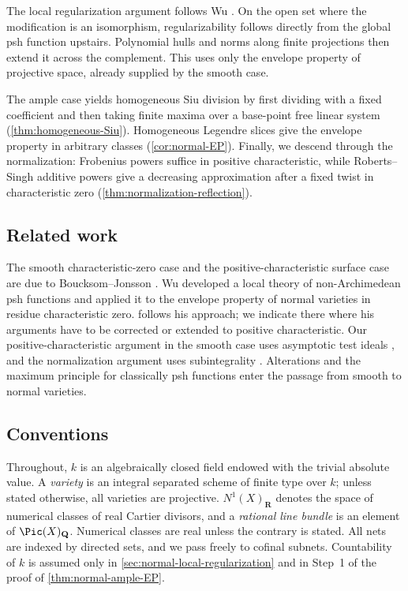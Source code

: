 \documentclass[11pt,a4paper]{article}
\begin{document}
The local regularization argument follows Wu \cite{Wu26}. On the open set where the modification is an isomorphism, regularizability follows directly from the global psh function upstairs. Polynomial hulls and norms along finite projections then extend it across the complement. This uses only the envelope property of projective space, already supplied by the smooth case.

The ample case yields homogeneous Siu division by first dividing with a fixed coefficient and then taking finite maxima over a base-point free linear system (\cref{thm:homogeneous-Siu}). Homogeneous Legendre slices give the envelope property in arbitrary classes (\cref{cor:normal-EP}). Finally, we descend through the normalization: Frobenius powers suffice in positive characteristic, while Roberts--Singh additive powers give a decreasing approximation after a fixed twist in characteristic zero (\cref{thm:normalization-reflection}).

\subsection{Related work}

The smooth characteristic-zero case and the positive-characteristic surface case are due to Boucksom--Jonsson \cite{BJ22,BJaddendum}. Wu \cite{Wu26} developed a local theory of non-Archimedean psh functions and applied it to the envelope property of normal varieties in residue characteristic zero.  follows his approach; we indicate there where his arguments have to be corrected or extended to positive characteristic. Our positive-characteristic argument in the smooth case uses asymptotic test ideals \cite{HaraYoshida,MustataTest,BMS08}, and the normalization argument uses subintegrality \cite{Swan80,RobertsSingh}. Alterations \cite{deJong} and the maximum principle for classically psh functions \cite{GublerRabinoff25} enter the passage from smooth to normal varieties.

\subsection{Conventions}\label{subsec:conventions}
Throughout, $k$ is an algebraically closed field endowed with the trivial absolute value.  A \emph{variety} is an integral separated scheme of finite type over $k$; unless stated otherwise, all varieties are projective.  $N^1(X)_{\mathbf{R}}$ denotes the space of numerical classes of real Cartier divisors, and a \emph{rational line bundle} is an element of $\Pic(X)_{\mathbf{Q}}$.  Numerical classes are real unless the contrary is stated.  All nets are indexed by directed sets, and we pass freely to cofinal subnets. Countability of $k$ is assumed only in \cref{sec:normal-local-regularization} and in Step~1 of the proof of \cref{thm:normal-ample-EP}.
\end{document}
